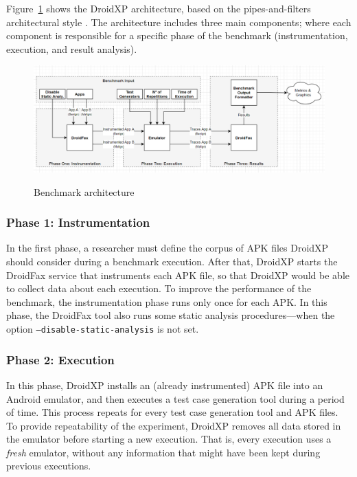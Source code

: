 Figure~\ref{fig:benchArq} shows the DroidXP architecture, based on the pipes-and-filters architectural style \cite{architecture-book}. 
The architecture includes three main components; where each component is responsible for a specific phase of the
benchmark (instrumentation, execution, and result analysis).



\begin{figure}[thb]
  \includegraphics[width=1\textwidth]{images/benchmark4.png}
  \label{benchArq}
  \caption{Benchmark architecture}
  \label{fig:benchArq}
\end{figure}
\subsubsection{Phase 1: Instrumentation}

In the first phase, a researcher must define the corpus of APK files DroidXP should consider during a benchmark execution. After that, DroidXP starts the DroidFax service that instruments each APK file, so that DroidXP would be able to collect data about each execution. To improve the performance of the benchmark, the instrumentation phase runs only once for each APK. In this phase, the DroidFax tool also runs some static analysis procedures---when the option \texttt{--disable-static-analysis} is not set.

\subsubsection{Phase 2: Execution}

In this phase, DroidXP installs an (already instrumented) APK file into
an Android emulator, and then executes a test case generation tool
during a period of time. This process repeats for every test case generation
tool and APK files. To provide repeatability of the experiment, DroidXP removes all data stored in the emulator before starting
a new execution. That is, every execution uses a \emph{fresh} emulator,
without any information that might have been kept during
previous executions. 

